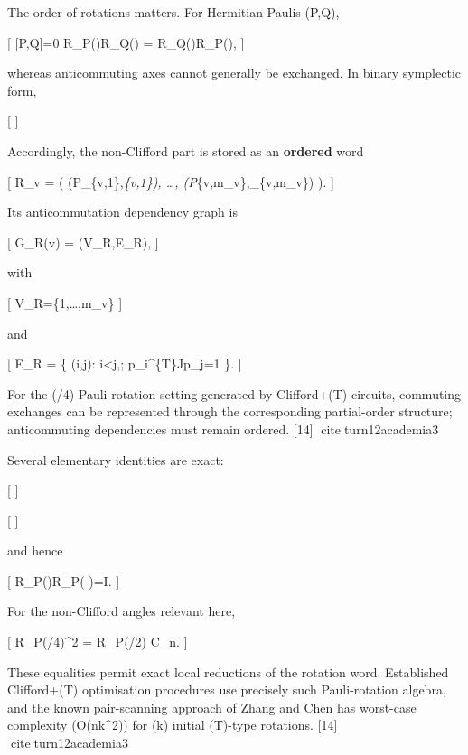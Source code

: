 \documentclass[
]{article}
\begin{document}
The order of rotations matters. For Hermitian Paulis (P,Q),

{[} {[}P,Q{]}=0 \Longrightarrow R\_P(\alpha)R\_Q(\beta) =
R\_Q(\beta)R\_P(\alpha),  {]}

whereas anticommuting axes cannot generally be exchanged. In binary
symplectic form,

{[}   {]}

Accordingly, the non-Clifford part is stored as an \textbf{ordered} word

{[} \mathcal R\_v = \bigl( (P\_\{v,1\},\theta\emph{\{v,1\}), \ldots,
(P}\{v,m\_v\},\theta\_\{v,m\_v\}) \bigr).  {]}

Its anticommutation dependency graph is

{[} G\_R(v) = (V\_R,E\_R),  {]}

with

{[} V\_R=\{1,\ldots,m\_v\} {]}

and

{[} E\_R = \left\{ (i,j): i\textless j,;
\mathbf p\_i\^{}\{\mathsf T\}J\mathbf p\_j=1 \right\}.  {]}

For the (\pi/4) Pauli-rotation setting generated by Clifford+(T)
circuits, commuting exchanges can be represented through the
corresponding partial-order structure; anticommuting dependencies must
remain ordered. {[}14{]} citeturn12academia3

Several elementary identities are exact:

{[}   {]}

{[}   {]}

and hence

{[} R\_P(\theta)R\_P(-\theta)=I.  {]}

For the non-Clifford angles relevant here,

{[} R\_P(\pi/4)\^{}2 = R\_P(\pi/2) \in\mathcal C\_n.  {]}

These equalities permit exact local reductions of the rotation word.
Established Clifford+(T) optimisation procedures use precisely such
Pauli-rotation algebra, and the known pair-scanning approach of Zhang
and Chen has worst-case complexity (O(nk\^{}2)) for (k) initial (T)-type
rotations. {[}14{]} citeturn12academia3
\end{document}

